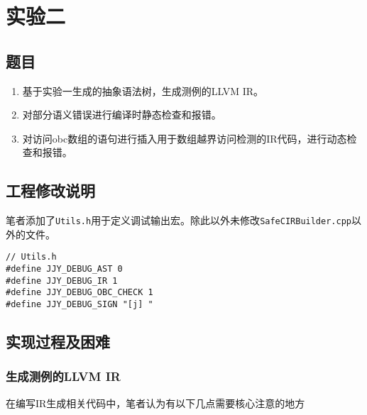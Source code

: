\documentclass[../main.tex]{subfiles}
\begin{document}
\section{实验二}

\subsection{题目}

\kaishu

\begin{enumerate}
	\item 基于实验一生成的抽象语法树，生成测例的LLVM IR。
	\item 对部分语义错误进行编译时静态检查和报错。
	\item 对访问obc数组的语句进行插入用于数组越界访问检测的IR代码，进行动态检查和报错。
\end{enumerate}

\songti
\subsection{工程修改说明}

笔者添加了\texttt{Utils.h}用于定义调试输出宏。除此以外未修改\texttt{SafeCIRBuilder.cpp}以外的文件。

\begin{mdframed}
	\begin{verbatim}
// Utils.h
#define JJY_DEBUG_AST 0
#define JJY_DEBUG_IR 1
#define JJY_DEBUG_OBC_CHECK 1
#define JJY_DEBUG_SIGN "[j] "
  \end{verbatim}
\end{mdframed}

\subsection{实现过程及困难}

\subsubsection{生成测例的LLVM IR}

在编写IR生成相关代码中，笔者认为有以下几点需要核心注意的地方
\end{document}
